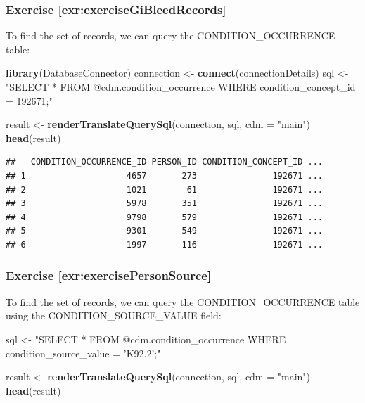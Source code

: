 \documentclass[11pt]{book}
\newenvironment{Shaded}{\begin{snugshade}}{\end{snugshade}}
\newcommand{\KeywordTok}[1]{\textcolor[rgb]{0.13,0.29,0.53}{\textbf{#1}}}
\newcommand{\DataTypeTok}[1]{\textcolor[rgb]{0.13,0.29,0.53}{#1}}
\newcommand{\StringTok}[1]{\textcolor[rgb]{0.31,0.60,0.02}{#1}}
\newcommand{\NormalTok}[1]{#1}
\theoremstyle{definition}
\theoremstyle{definition}
\theoremstyle{definition}
\theoremstyle{remark}
\begin{document}
\subsubsection*{Exercise
\ref{exr:exerciseGiBleedRecords}}\label{exercise-refexrexercisegibleedrecords}

To find the set of records, we can query the CONDITION\_OCCURRENCE
table:

\begin{Shaded}
\begin{Highlighting}[]
\KeywordTok{library}\NormalTok{(DatabaseConnector)}
\NormalTok{connection <-}\StringTok{ }\KeywordTok{connect}\NormalTok{(connectionDetails)}
\NormalTok{sql <-}\StringTok{ "SELECT *}
\StringTok{FROM @cdm.condition_occurrence}
\StringTok{WHERE condition_concept_id = 192671;"}

\NormalTok{result <-}\StringTok{ }\KeywordTok{renderTranslateQuerySql}\NormalTok{(connection, sql, }\DataTypeTok{cdm =} \StringTok{"main"}\NormalTok{)}
\KeywordTok{head}\NormalTok{(result)}
\end{Highlighting}
\end{Shaded}

\begin{verbatim}
##   CONDITION_OCCURRENCE_ID PERSON_ID CONDITION_CONCEPT_ID ...
## 1                    4657       273               192671 ...
## 2                    1021        61               192671 ...
## 3                    5978       351               192671 ...
## 4                    9798       579               192671 ...
## 5                    9301       549               192671 ...
## 6                    1997       116               192671 ...
\end{verbatim}

\subsubsection*{Exercise
\ref{exr:exercisePersonSource}}\label{exercise-refexrexercisepersonsource}

To find the set of records, we can query the CONDITION\_OCCURRENCE table
using the CONDITION\_SOURCE\_VALUE field:

\begin{Shaded}
\begin{Highlighting}[]
\NormalTok{sql <-}\StringTok{ "SELECT *}
\StringTok{FROM @cdm.condition_occurrence}
\StringTok{WHERE condition_source_value = 'K92.2';"}

\NormalTok{result <-}\StringTok{ }\KeywordTok{renderTranslateQuerySql}\NormalTok{(connection, sql, }\DataTypeTok{cdm =} \StringTok{"main"}\NormalTok{)}
\KeywordTok{head}\NormalTok{(result)}
\end{Highlighting}
\end{Shaded}
\end{document}
